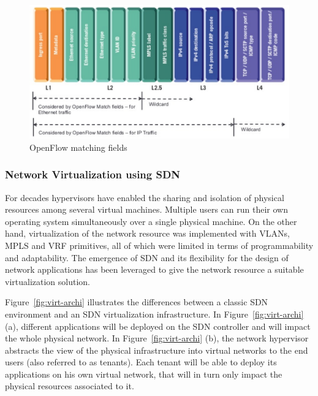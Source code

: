 \begin{figure}[h]
    \centering
    \includegraphics[scale=0.7]{figures/openflow-matchfields.pdf}
    \caption{OpenFlow matching fields~\cite{openflow-matchfields}}
    \label{fig:matching-fields}
\end{figure}

\subsubsection{Network Virtualization using SDN}
\label{def:netvirt}

For decades hypervisors have enabled the sharing and isolation of physical resources among several virtual machines.
Multiple users can run their own operating system simultaneously over a single physical machine.
On the other hand, virtualization of the network resource was implemented with VLANs, MPLS and VRF primitives, all of which were limited in terms of programmability and adaptability. The emergence of SDN and its flexibility for the design of network applications has been leveraged to give the network resource a suitable virtualization solution.

Figure~\ref{fig:virt-archi} illustrates the differences between a classic SDN environment and an SDN virtualization infrastructure. In Figure~\ref{fig:virt-archi} (a), different applications will be deployed on the SDN controller and will impact the whole physical network.
In Figure~\ref{fig:virt-archi} (b), the network hypervisor abstracts the view of the physical infrastructure into virtual networks to the end users (also referred to as tenants).
Each tenant will be able to deploy its applications on his own virtual network, that will in turn only impact the physical resources associated to it.

